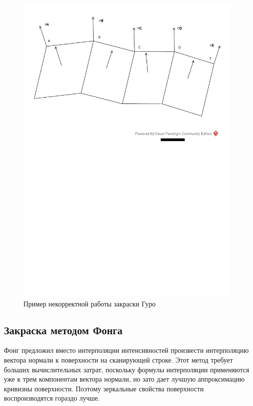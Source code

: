 \begin{figure}[H]
	\centering
	\includegraphics[width=1.0\textwidth]{Knizhka.pdf}
	\caption{Пример некорректной работы закраски Гуро}
	\label{fig:Guro_book}
\end{figure}

\subsection{Закраска методом Фонга}
Фонг предложил вместо интерполяции интенсивностей произвести интерполяцию вектора нормали к поверхности на сканирующей строке. Этот метод требует больших вычислительных затрат, поскольку формулы интерполяции применяются уже к трем компонентам вектора нормали, но зато дает лучшую аппроксимацию кривизны поверхности. Поэтому зеркальные свойства поверхности воспроизводятся гораздо лучше.

